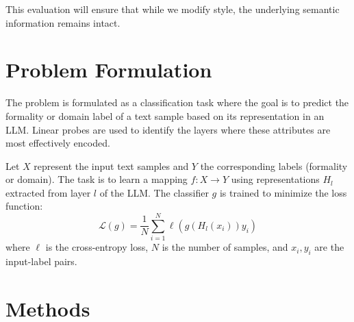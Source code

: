 \documentclass{article}
\begin{document}
This evaluation will ensure that while we modify style, the underlying semantic information remains intact.

\section{Problem Formulation}

The problem is formulated as a classification task where the goal is to predict the formality or domain label of a text sample based on its representation in an LLM. Linear probes are used to identify the layers where these attributes are most effectively encoded.

Let $X$ represent the input text samples and $Y$ the corresponding labels (formality or domain). The task is to learn a mapping $f: X \to Y$ using representations $H_l$ extracted from layer $l$ of the LLM. The classifier $g$ is trained to minimize the loss function:
\begin{equation}
\mathcal{L}(g) = \frac{1}{N} \sum_{i=1}^N \ell(g(H_l(x_i)) y_i)
\end{equation}
where $\ell$ is the cross-entropy loss, $N$ is the number of samples, and $x_i, y_i$ are the input-label pairs.


\section{Methods}
\end{document}
